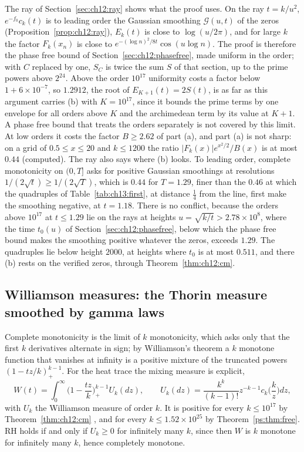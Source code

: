 The ray of Section~\ref{sec:ch12:ray} shows what the proof uses. On the ray $t=k/u^2$, $e^{-f_0}c_k(t)$ is to leading order the Gaussian smoothing $\mathcal G(u,t)$ of the zeros (Proposition~\ref{prop:ch12:ray}), $E_k(t)$ is close to $\log(u/2\pi)$, and for large $k$ the factor $F_k(x_n)$ is close to $e^{-(\log n)^2/8t}\cos(u\log n)$. The proof is therefore the phase free bound of Section~\ref{sec:ch12:phasefree}, made uniform in the order; with $C$ replaced by one, $S_C$ is twice the sum $S$ of that section, up to the prime powers above $2^{24}$. Above the order $10^{17}$ uniformity costs a factor below $1+6\times10^{-7}$, so $1.2912$, the root of $E_{K+1}(t)=2S(t)$, is as far as this argument carries (b) with $K=10^{17}$, since it bounds the prime terms by one envelope for all orders above $K$ and the archimedean term by its value at $K+1$. A phase free bound that treats the orders separately is not covered by this limit. At low orders it costs the factor $B\ge2.62$ of part (a), and part (a) is not sharp: on a grid of $0.5\le x\le20$ and $k\le1200$ the ratio $|F_k(x)|e^{x^2/2}/B(x)$ is at most $0.44$ (computed). The ray also says where (b) looks. To leading order, complete monotonicity on $(0,T]$ asks for positive Gaussian smoothings at resolutions $1/(2\sqrt t)\ge1/(2\sqrt T)$, which is $0.44$ for $T=1.29$, finer than the $0.46$ at which the quadruples of Table~\ref{tab:ch13:first}, at distance $\frac14$ from the line, first make the smoothing negative, at $t=1.18$. There is no conflict, because the orders above $10^{17}$ at $t\le1.29$ lie on the rays at heights $u=\sqrt{k/t}>2.78\times10^8$, where the time $t_0(u)$ of Section~\ref{sec:ch12:phasefree}, below which the phase free bound makes the smoothing positive whatever the zeros, exceeds $1.29$. The quadruples lie below height $2000$, at heights where $t_0$ is at most $0.511$, and there (b) rests on the verified zeros, through Theorem~\ref{thm:ch12:cm}.

\subsection{Williamson measures: the Thorin measure smoothed by gamma laws}\label{sec:ch12:kmono}

Complete monotonicity is the limit of $k$ monotonicity, which asks only that the first $k$ derivatives alternate in sign; by Williamson's theorem \cite{Williamson} a $k$ monotone function that vanishes at infinity is a positive mixture of the truncated powers $(1-tz/k)_+^{k-1}$. For the heat trace the mixing measure is explicit,
\[
W(t)=\int_0^\infty\Big(1-\frac{tz}k\Big)_+^{k-1}U_k(dz),\qquad U_k(dz)=\frac{k^k}{(k-1)!}z^{-k-1}c_k\Big(\frac kz\Big)dz,
\]
with $U_k$ the Williamson measure of order $k$. It is positive for every $k\le10^{17}$ by Theorem~\ref{thm:ch12:cm} \cite[Corollary 7.13]{P17}, and for every $k\le1.52\times10^{25}$ by Theorem~\ref{ps:thm:free}. RH holds if and only if $U_k\ge0$ for infinitely many $k$, since then $W$ is $k$ monotone for infinitely many $k$, hence completely monotone.

